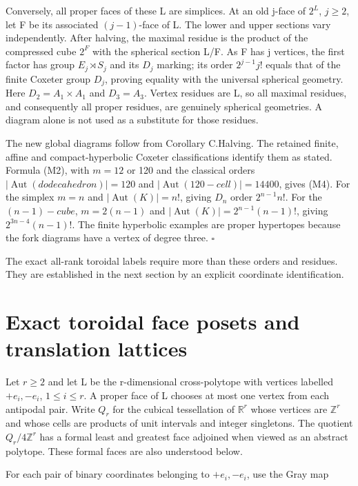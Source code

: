 Conversely, all proper faces of these L are simplices. At an old j-face
of \(2^L\), \(j\ge 2\), let F be its associated \((j-1)\)-face of L. The
lower and upper sections vary independently. After halving, the maximal
residue is the product of the compressed cube \(2^F\) with the spherical
section L/F. As F has j vertices, the first factor has group
\(E_j\rtimes S_j\) and its \(D_j\) marking; its order \(2^{j-1}j!\)
equals that of the finite Coxeter group \(D_j\), proving equality with
the universal spherical geometry. Here \(D_{2}=A_{1}\times A_{1}\) and
\(D_{3}=A_{3}\). Vertex residues are L, so all maximal residues, and
consequently all proper residues, are genuinely spherical geometries. A
diagram alone is not used as a substitute for those residues.

The new global diagrams follow from Corollary C.Halving. The retained
finite, affine and compact-hyperbolic Coxeter classifications identify
them as stated. Formula (M2), with \(m=12\) or 120 and the classical
orders \(|\operatorname{Aut}(dodecahedron)|=120\) and
\(|\operatorname{Aut}(120-cell)|=14400\), gives (M4). For the simplex
\(m=n\) and \(|\operatorname{Aut}(K)|=n!\), giving \(D_n\) order
\(2^{n-1}n!\). For the \((n-1)-cube\), \(m=2(n-1)\) and
\(|\operatorname{Aut}(K)|=2^{n-1}(n-1)!\), giving \(2^{3n-4}(n-1)!\).
The finite hyperbolic examples are proper hypertopes because the fork
diagrams have a vertex of degree three. \(\square\)

The exact all-rank toroidal labels require more than these orders and
residues. They are established in the next section by an explicit
coordinate identification.

\section{Exact toroidal face posets and translation
lattices}\label{exact-toroidal-face-posets-and-translation-lattices}

Let \(r\ge 2\) and let L be the r-dimensional cross-polytope with
vertices labelled \(+e_i,-e_i\), \(1\le i\le r\). A proper face of L
chooses at most one vertex from each antipodal pair. Write \(Q_r\) for
the cubical tessellation of \(\mathbb R^r\) whose vertices are
\(\mathbb Z^r\) and whose cells are products of unit intervals and
integer singletons. The quotient \(Q_r/4\mathbb Z^r\) has a formal least
and greatest face adjoined when viewed as an abstract polytope. These
formal faces are also understood below.

For each pair of binary coordinates belonging to \(+e_i,-e_i\), use the
Gray map

